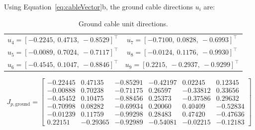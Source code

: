 \noindent Using Equation~\ref{eq:cableVector}b, the ground cable directions $u_i$ are:

\begin{table}[h]
    \centering
    \begin{tabular}{cc}
        $u_4 = [-0.2245,\ 0.4713,\ -0.8529]^\top$ & $u_7 = [-0.7100,\ 0.0828,\ -0.6993]^\top$ \\
        $u_5 = [-0.0089,\ 0.7024,\ -0.7117]^\top$ & $u_8 = [-0.0124,\ 0.1176,\ -0.9930]^\top$ \\
        $u_6 = [-0.4545,\ 0.1047,\ -0.8846]^\top$ & $u_9 = [0.2215,\ -0.2937,\ -0.9299]^\top$ \\
    \end{tabular}
    \caption{Ground cable unit directions.}
\end{table}

\begin{equation}
J_{p,\text{ground}} =
\begin{bmatrix}
-0.22445 & 0.47135 & -0.85291 & -0.42197 & 0.02245 & 0.12345 \\
-0.00888 & 0.70238 & -0.71175 & 0.26597 & -0.33812 & 0.33656 \\
-0.45452 & 0.10475 & -0.88456 & 0.25373 & -0.37586 & 0.29632 \\
-0.70998 & 0.08282 & -0.69934 & 0.20060 & 0.40409 & -0.52834 \\
-0.01239 & 0.11759 & -0.99298 & 0.28483 & 0.47420 & -0.47636 \\
0.22151 & -0.29365 & -0.92989 & -0.54081 & -0.02215 & -0.12183
\end{bmatrix}
\end{equation}


